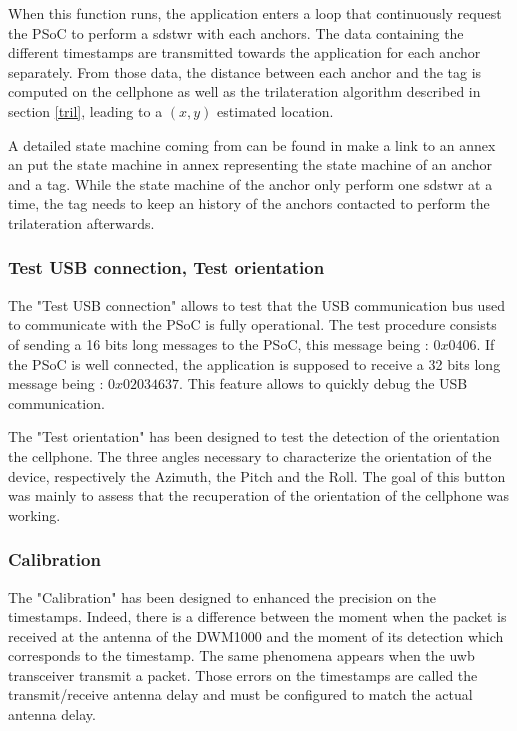 When this function runs, the application enters a loop that continuously request the PSoC to perform a \gls{sdstwr} with each anchors. The data containing the different timestamps are transmitted towards the application for each anchor separately. From those data, the distance between each anchor and the tag is computed on the cellphone as well as the trilateration algorithm described in section \ref{tril}, leading to a $(x, y)$ estimated location.
\vspace{2mm}

A detailed state machine coming from \cite{hannotier2019indoor} can be found in \color{red} make a link to an annex an put the state machine in annex \color{black} representing the state machine of an anchor and a tag. While the state machine of the anchor only perform one \gls{sdstwr} at a time, the tag needs to keep an history of the anchors contacted to perform the trilateration afterwards.


\subsubsection{Test USB connection, Test orientation}

The "Test USB connection" allows to test that the USB communication bus used to communicate with the PSoC is fully operational. The test procedure consists of sending a 16 bits long messages to the PSoC, this message being : $0x0406$. If the PSoC is well connected, the application is supposed to receive a 32 bits long message being : $0x02034637$. This feature allows to quickly debug the USB communication.
\vspace{2mm}

The "Test orientation" has been designed to test the detection of the orientation the cellphone. The three angles necessary to characterize the orientation of the device, respectively the Azimuth, the Pitch and the Roll. The goal of this button was mainly to assess that the recuperation of the orientation of the cellphone was working.

\subsubsection{Calibration}

The "Calibration" has been designed to enhanced the precision on the timestamps. Indeed, there is a difference between the moment when the packet is received at the antenna of the DWM1000 and the moment of its detection which corresponds to the timestamp. The same phenomena appears when the \gls{uwb} transceiver transmit a packet. Those errors on the timestamps are called the transmit/receive antenna delay and must be configured to match the actual antenna delay.

